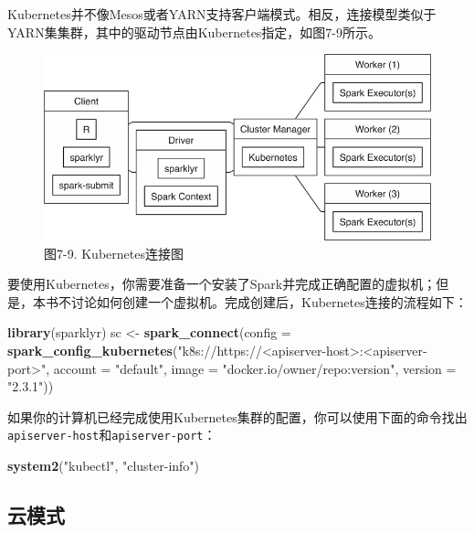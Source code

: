 \documentclass[
]{article}
\newenvironment{Shaded}{\begin{snugshade}}{\end{snugshade}}
\newcommand{\DataTypeTok}[1]{\textcolor[rgb]{0.13,0.29,0.53}{#1}}
\newcommand{\KeywordTok}[1]{\textcolor[rgb]{0.13,0.29,0.53}{\textbf{#1}}}
\newcommand{\NormalTok}[1]{#1}
\newcommand{\StringTok}[1]{\textcolor[rgb]{0.31,0.60,0.02}{#1}}
\begin{document}
Kubernetes并不像Mesos或者YARN支持客户端模式。相反，连接模型类似于YARN集集群，其中的驱动节点由Kubernetes指定，如图7-9所示。

\begin{figure}
\centering
\includegraphics{figures/7_9.png}
\caption{图7-9. Kubernetes连接图}
\end{figure}

要使用Kubernetes，你需要准备一个安装了Spark并完成正确配置的虚拟机；但是，本书不讨论如何创建一个虚拟机。完成创建后，Kubernetes连接的流程如下：

\begin{Shaded}
\begin{Highlighting}[]
\KeywordTok{library}\NormalTok{(sparklyr)}
\NormalTok{sc <-}\StringTok{ }\KeywordTok{spark_connect}\NormalTok{(}\DataTypeTok{config =} \KeywordTok{spark_config_kubernetes}\NormalTok{(}\StringTok{"k8s://https://<apiserver-host>:<apiserver-port>"}\NormalTok{, }
    \DataTypeTok{account =} \StringTok{"default"}\NormalTok{, }\DataTypeTok{image =} \StringTok{"docker.io/owner/repo:version"}\NormalTok{, }\DataTypeTok{version =} \StringTok{"2.3.1"}\NormalTok{))}
\end{Highlighting}
\end{Shaded}

如果你的计算机已经完成使用Kubernetes集群的配置，你可以使用下面的命令找出\texttt{apiserver-host}和\texttt{apiserver-port}：

\begin{Shaded}
\begin{Highlighting}[]
\KeywordTok{system2}\NormalTok{(}\StringTok{"kubectl"}\NormalTok{, }\StringTok{"cluster-info"}\NormalTok{)}
\end{Highlighting}
\end{Shaded}

\hypertarget{ux4e91ux6a21ux5f0f}{%
\subsection{云模式}\label{ux4e91ux6a21ux5f0f}}
\end{document}
